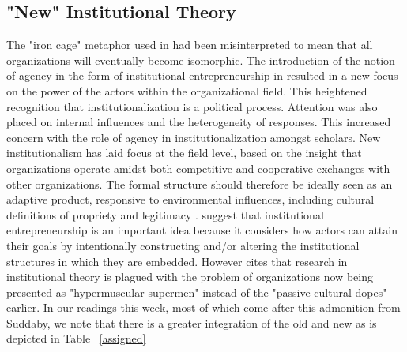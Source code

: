 \documentclass[12pt]{article}
\begin{document}
\subsection{"New" Institutional Theory}
The "iron cage" metaphor used in \cite{Dimaggio1983} had been misinterpreted to mean that all organizations will eventually become isomorphic. The introduction of the notion of agency in the form of institutional entrepreneurship in \cite{Dimaggio1988} resulted in a new focus on the power of the actors within the organizational field. This heightened recognition that institutionalization is a political process. Attention was also placed on  internal influences and the heterogeneity of responses. This increased concern with the role of agency in institutionalization amongst scholars. New institutionalism has laid focus at the field level, based on the insight that organizations operate amidst both competitive and cooperative exchanges with other organizations. The formal structure should therefore be ideally seen as an adaptive product, responsive to environmental influences, including cultural definitions of propriety and legitimacy \citep{Selznick1996}.  \cite{Philips2009} suggest that institutional entrepreneurship is an important idea because it considers how actors can attain their goals by intentionally constructing and/or altering the institutional structures in which they are embedded. However \cite{Suddaby2010} cites that research in institutional theory is plagued with the problem of organizations now being presented as "hypermuscular supermen" instead of the "passive cultural dopes" earlier. In our readings this week, most of which come after this admonition from Suddaby, we note that there is a greater integration of the old and new as is depicted in Table ~\ref{assigned}
\end{document}
